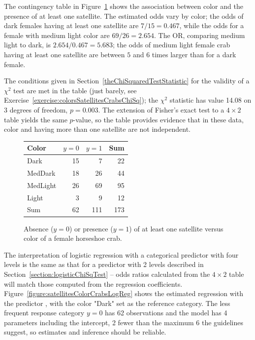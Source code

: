 The contingency table in Figure~\ref{figure:colorSatelliteCrabs} shows the association between color and the presence of at least one satellite.  The estimated odds vary by color; the odds of dark females having at least one satellite are $7/15 = 0.467$, while the odds for a female with medium light color are $69/26 = 2.654$. The OR, comparing medium light to dark, is $2.654/0.467 = 5.683$; the odds of medium light female crab having at least one satellite are between $5$ and $6$ times larger than for a dark female.

The conditions given in Section~\ref{theChiSquaredTestStatistic} for the validity of a $\chi^2$ test are met in the table (just barely, see Exercise~\ref{exercise:colorsSatellitesCrabsChiSq}); the $\chi^2$ statistic has value 14.08 on 3 degrees of freedom, $p = 0.003$.  The extension of Fisher's exact test to a $4 \times 2$ table yields the same $p$-value, so the table provides evidence that in these data, color and having more than one satellite are not independent.

\begin{figure}[ht]
\centering
\begin{tabular}{lrrr}
Color & $y = 0$ & $y = 1$ & Sum \\ \hline
Dark & 15 & 7 & 22 \\
MedDark & 18 & 26 & 44 \\
MedLight & 26 & 69 & 95 \\
Light & 3 & 9 & 12 \\ \hline
Sum & 62 & 111 & 173
\end{tabular}
\caption{Absence ($y = 0$) or presence ($y = 1$) of at least one satellite versus color of a female horseshoe crab.}
\label{figure:colorSatelliteCrabs}
\end{figure}

The interpretation of logistic regression with a categorical predictor with four levels is the same as that for a predictor with 2 levels described in Section~\ref{section:logisticChiSqTest}  --  odds ratios calculated from the $4 \times 2$ table will match those computed from the regression coefficients.  Figure~\ref{figure:satellitesColorCrabsLogReg} shows the estimated regression with the predictor , with the color "Dark" set as the reference category. The less frequent response category $y = 0$ has 62 observations and the model has 4 parameters including the intercept, 2 fewer than the maximum 6 the guidelines suggest, so estimates and inference should be reliable.

